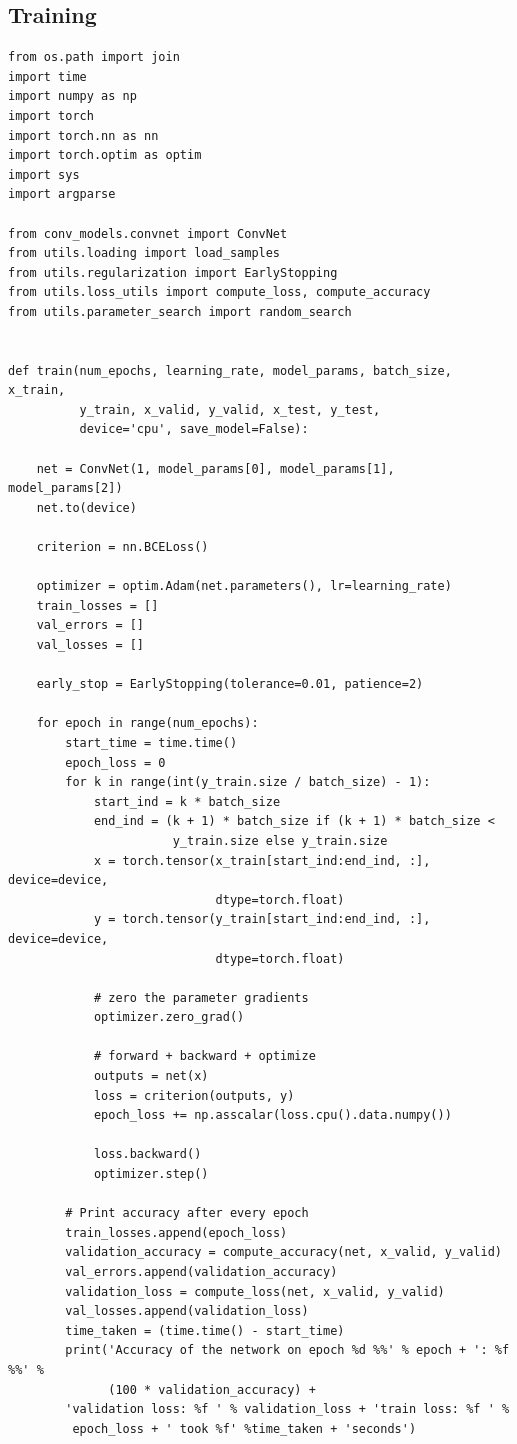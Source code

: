 \documentclass[aps,prb,10pt,twocolumn,groupedaddress]{revtex4-1}
\begin{document}
\subsection{Training}
\begin{lstlisting}
from os.path import join
import time
import numpy as np
import torch
import torch.nn as nn
import torch.optim as optim
import sys
import argparse

from conv_models.convnet import ConvNet
from utils.loading import load_samples
from utils.regularization import EarlyStopping
from utils.loss_utils import compute_loss, compute_accuracy
from utils.parameter_search import random_search


def train(num_epochs, learning_rate, model_params, batch_size, x_train,
          y_train, x_valid, y_valid, x_test, y_test,
          device='cpu', save_model=False):

	net = ConvNet(1, model_params[0], model_params[1], model_params[2])
	net.to(device)

	criterion = nn.BCELoss()

	optimizer = optim.Adam(net.parameters(), lr=learning_rate)
	train_losses = []
	val_errors = []
	val_losses = []

	early_stop = EarlyStopping(tolerance=0.01, patience=2)

	for epoch in range(num_epochs):
		start_time = time.time()
		epoch_loss = 0
		for k in range(int(y_train.size / batch_size) - 1):
			start_ind = k * batch_size
			end_ind = (k + 1) * batch_size if (k + 1) * batch_size <
					   y_train.size else y_train.size
			x = torch.tensor(x_train[start_ind:end_ind, :], device=device,
				             dtype=torch.float)
			y = torch.tensor(y_train[start_ind:end_ind, :], device=device,
						     dtype=torch.float)

			# zero the parameter gradients
			optimizer.zero_grad()

			# forward + backward + optimize
			outputs = net(x)
			loss = criterion(outputs, y)
			epoch_loss += np.asscalar(loss.cpu().data.numpy())

			loss.backward()
			optimizer.step()

		# Print accuracy after every epoch
		train_losses.append(epoch_loss)
		validation_accuracy = compute_accuracy(net, x_valid, y_valid)
		val_errors.append(validation_accuracy)
		validation_loss = compute_loss(net, x_valid, y_valid)
		val_losses.append(validation_loss)
		time_taken = (time.time() - start_time)
		print('Accuracy of the network on epoch %d %%' % epoch + ': %f %%' %
		      (100 * validation_accuracy) +
		'validation loss: %f ' % validation_loss + 'train loss: %f ' %
		 epoch_loss + ' took %f' %time_taken + 'seconds')
	

\end{lstlisting}
\end{document}
